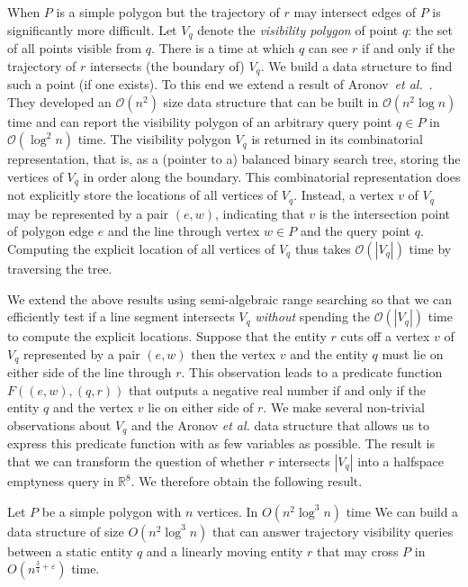 \documentclass[UKenglish]{lipics-v2019}
\newcommand{\etal}{\textit{et al.}\xspace}
\newcommand{\mkmcal}[1]{\ensuremath{\mathcal{#1}}\xspace}
\renewcommand{\O}{\mkmcal{O}}
\newcommand{\eps}{\ensuremath{\varepsilon}\xspace}
\begin{document}
 When $P$ is a simple polygon but the trajectory of $r$ may intersect edges
of $P$ is significantly more difficult. 
Let $V_q$ denote the \emph{visibility polygon} of point $q$: the set
of all points visible from $q$. There is a time at which $q$ can see
$r$ if and only if the trajectory of $r$ intersects (the boundary of)
$V_q$. We build a data structure to find such a point (if one
exists). To this end we extend a result of 
Aronov~\etal~\cite{aronov2002visibility}. They developed an $\O(n^2)$ size
data structure that can be built in $\O(n^2\log n)$ time and can report the
visibility polygon of an arbitrary query point $q \in P$ in $\O(\log^2 n)$
time. The visibility polygon $V_q$ is returned in its combinatorial
representation, that is, as a (pointer to a) balanced binary search tree,
storing the vertices of $V_q$ in order along the boundary. This combinatorial representation does not explicitly store the
locations of all vertices of $V_q$. Instead, a vertex $v$ of $V_q$ may be
represented by a pair $(e,w)$, indicating that $v$ is the intersection point of polygon edge $e$ and the line through vertex $w \in P$ and the query point
$q$. Computing the explicit location of all vertices of $V_q$ thus takes
$\O(|V_q|)$ time by traversing the tree.

We extend the above results using semi-algebraic range searching so that we can efficiently test if a line segment intersects $V_q$ \emph{without} spending the $\O(|V_q|)$ time to compute the explicit locations.
Suppose that the entity $r$ cuts off a vertex $v$ of $V_q$ represented by a pair $(e,w)$ then the vertex $v$ and the entity $q$ must lie on either side of the line through $r$. This observation leads to a predicate function $F( (e,w), (q,r))$ that outputs a negative real number if and only if the entity $q$ and the vertex $v$ lie on either side of $r$. We make several non-trivial observations about $V_q$ and the Aronov \etal data structure that allows us to express this predicate function with as few variables as possible. The result is that we can transform the question of whether $r$ intersects $|V_q|$ into a halfspace emptyness query in $\mathbb{R}^8$. We therefore obtain the following result.

\begin{theorem}
  \label{thm:one_dead_one_ghost}
  Let $P$ be a simple polygon with $n$ vertices. In $O(n^2\log^3 n)$ time We
  can build a data structure of size $O(n^2\log^3 n)$ that can answer
  trajectory visibility queries between a static entity $q$ and a linearly
  moving entity $r$ that may cross $P$ in $O(n^{\frac{3}{4}+\eps})$ time.
\end{theorem}
\end{document}
